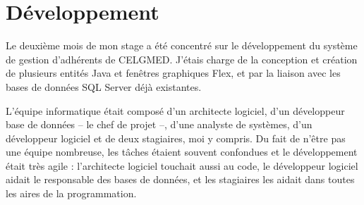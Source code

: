 \section{Développement}


Le deuxième mois de mon stage a été concentré sur le développement du système de gestion d'adhérents de CELGMED. J'étais charge de la conception et création de plusieurs entités Java et fenêtres graphiques Flex, et par la liaison avec les bases de données SQL Server déjà existantes.

L'équipe informatique était composé d'un architecte logiciel, d'un développeur base de données -- le chef de projet --, d'une analyste de systèmes, d'un développeur logiciel et de deux stagiaires, moi y compris. Du fait de n'être pas une équipe nombreuse, les tâches étaient souvent confondues et le développement était très agile : l'architecte logiciel touchait aussi au code, le développeur logiciel aidait le responsable des bases de données, et les stagiaires les aidait dans toutes les aires de la programmation.



